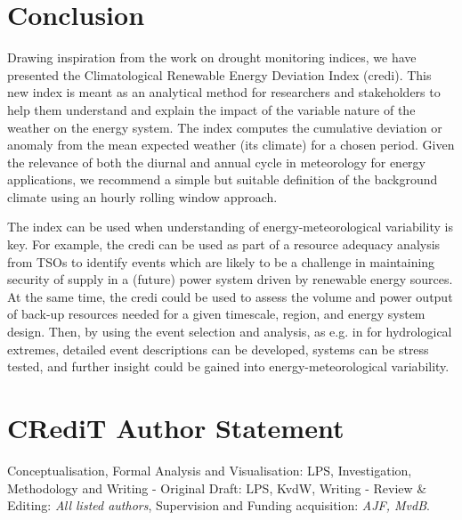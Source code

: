 \documentclass[12pt]{iopart}
\newcommand{\credi}[0]{{\sc credi}}
\begin{document}


\section{Conclusion}\label{secCP2:conclusion}
Drawing inspiration from the work on drought monitoring indices, we have presented the Climatological Renewable Energy Deviation Index (\credi{}). 
This new index is meant as an analytical method for researchers and stakeholders to help them understand and explain the impact of the variable nature of the weather on the energy system. 
The index computes the cumulative deviation or anomaly from the mean expected weather (its climate) for a chosen period. 
Given the relevance of both the diurnal and annual cycle in meteorology for energy applications, we recommend a simple but suitable definition of the background climate using an hourly rolling window approach. 

The index can be used when understanding of energy-meteorological variability is key. 
For example, the \credi{} can be used as part of a resource adequacy analysis from TSOs to identify events which are likely to be a challenge in maintaining security of supply in a (future) power system driven by renewable energy sources. 
At the same time, the \credi{} could be used to assess the volume and power output of back-up resources needed for a given timescale, region, and energy system design.
Then, by using the event selection and analysis, as e.g. in \textcite{vanderWiel2021} for hydrological extremes, detailed event descriptions can be developed, systems can be stress tested, and further insight could be gained into energy-meteorological variability.






\section*{CRediT Author Statement}
Conceptualisation, Formal Analysis and Visualisation: LPS, Investigation, Methodology and Writing - Original Draft: LPS, KvdW, Writing - Review \& Editing: \emph{All listed authors}, Supervision and Funding acquisition: \emph{AJF, MvdB}. 
\end{document}

